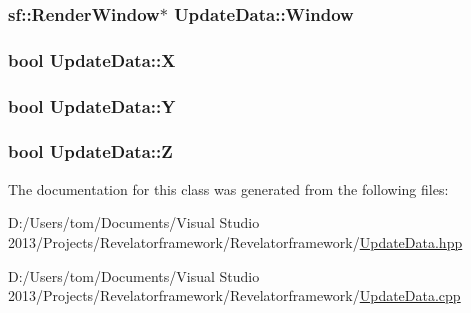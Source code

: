 \hypertarget{class_update_data_a55a408e4c722338ac61cc8d53ae704d2}{
\subsubsection[{Window}]{\setlength{\rightskip}{0pt plus 5cm}sf\-::\-Render\-Window$\ast$ Update\-Data\-::\-Window\hspace{0.3cm}{\ttfamily [private]}}}\label{class_update_data_a55a408e4c722338ac61cc8d53ae704d2}
\hypertarget{class_update_data_a10a2666372025908c0db20e1d8b4651e}{
\subsubsection[{X}]{\setlength{\rightskip}{0pt plus 5cm}bool Update\-Data\-::\-X\hspace{0.3cm}{\ttfamily [private]}}}\label{class_update_data_a10a2666372025908c0db20e1d8b4651e}
\hypertarget{class_update_data_a64c1689912e748c656418e3d81cc3e4a}{
\subsubsection[{Y}]{\setlength{\rightskip}{0pt plus 5cm}bool Update\-Data\-::\-Y\hspace{0.3cm}{\ttfamily [private]}}}\label{class_update_data_a64c1689912e748c656418e3d81cc3e4a}
\hypertarget{class_update_data_ab3e80604d2336942286e78e83fecfc59}{
\subsubsection[{Z}]{\setlength{\rightskip}{0pt plus 5cm}bool Update\-Data\-::\-Z\hspace{0.3cm}{\ttfamily [private]}}}\label{class_update_data_ab3e80604d2336942286e78e83fecfc59}


The documentation for this class was generated from the following files\-:\begin{DoxyCompactItemize}
\item 
D\-:/\-Users/tom/\-Documents/\-Visual Studio 2013/\-Projects/\-Revelatorframework/\-Revelatorframework/\hyperlink{_update_data_8hpp}{Update\-Data.\-hpp}\item 
D\-:/\-Users/tom/\-Documents/\-Visual Studio 2013/\-Projects/\-Revelatorframework/\-Revelatorframework/\hyperlink{_update_data_8cpp}{Update\-Data.\-cpp}\end{DoxyCompactItemize}
